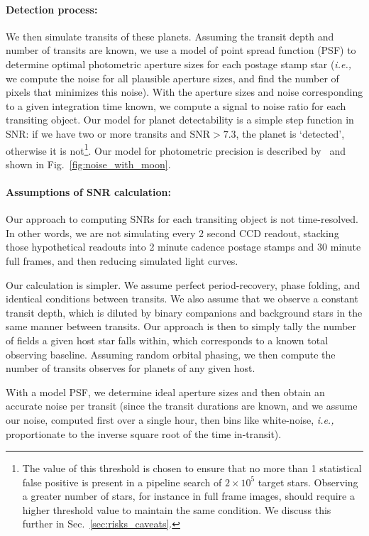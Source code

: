 \paragraph{Detection process:}
We then simulate transits of these planets.  Assuming the transit
depth and number of transits are known, we use a model of \tesss point
spread function (PSF) to determine optimal photometric aperture sizes
for each postage stamp star (\textit{i.e.,} we compute the noise for
all plausible aperture sizes, and find the number of pixels that
minimizes this noise).  With the aperture sizes and noise
corresponding to a given integration time known, we compute a signal
to noise ratio for each transiting object.  Our model for planet
detectability is a simple step function in SNR: if we have two or more
transits and $\text{SNR} > 7.3$, the planet is `detected', otherwise
it is not\footnote{The value of this threshold is chosen to
  ensure that no more than 1 statistical false positive is present in
  a pipeline search of $2\times10^5$ target stars. Observing a
  greater number of stars, for instance in full frame images, should
  require a higher threshold value to maintain the same condition. We
  discuss this further in Sec.~\protect\ref{sec:risks_caveats}.}.  Our model for
\tesss photometric precision is described
by~ and shown in
Fig.~\ref{fig:noise_with_moon}.

\paragraph{Assumptions of SNR calculation:}
Our approach to computing SNRs for each transiting object is not
time-resolved.  In other words, we are not simulating every 2 second
CCD readout, stacking those hypothetical readouts into 2 minute
cadence postage stamps and 30 minute full frames, and then reducing
simulated light curves.

Our calculation is simpler.  We assume perfect period-recovery, phase
folding, and identical conditions between transits.  We also assume
that we observe a constant transit depth, which is diluted by binary
companions and background stars in the same manner between transits.
Our approach is then to simply tally the number of \tess fields a
given host star falls within, which corresponds to a known total
observing baseline.  Assuming random orbital phasing, we then compute
the number of transits \tess observes for planets of any given host.

With a model PSF, we determine ideal aperture sizes and then obtain 
an accurate noise per transit
(since the transit durations are known, and we assume our noise,
computed first over a single hour, then bins like white-noise,
\textit{i.e.,} proportionate to the inverse square root of the time
in-transit).

